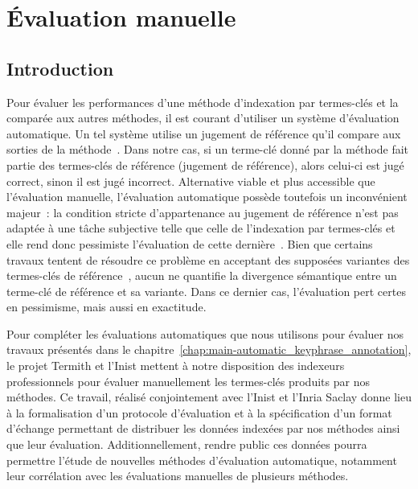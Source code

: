 \chapter{Évaluation manuelle}
\label{chap:main-manuelle_evaluation_of_keyphrase_annotation}

  \section{Introduction}
  \label{sec:main-automatic_evaluation_of_keyphrase_annotation-introduction}
    Pour évaluer les performances d'une méthode d'indexation par termes-clés et
    la comparée aux autres méthodes, il est courant d'utiliser un système
    d'évaluation automatique. Un tel système utilise un jugement de référence
    qu'il compare aux sorties de la méthode~\cite{voorhees2002philosophy}. Dans
    notre cas, si un terme-clé donné par la méthode fait partie des termes-clés
    de référence (jugement de référence), alors celui-ci est jugé correct, sinon
    il est jugé incorrect. Alternative viable et plus accessible que
    l'évaluation manuelle, l'évaluation automatique possède toutefois un
    inconvénient majeur~: la condition stricte d'appartenance au jugement de
    référence n'est pas adaptée à une tâche subjective telle que celle de
    l'indexation par termes-clés et elle rend donc pessimiste l'évaluation de
    cette dernière~\cite{hasan2014state_of_the_art}. Bien que certains travaux
    tentent de résoudre ce problème en acceptant des supposées variantes des
    termes-clés de référence~\cite{zesch2009rprecision,kim2010rprecision}, aucun
    ne quantifie la divergence sémantique entre un terme-clé de référence et sa
    variante. Dans ce dernier cas, l'évaluation pert certes en pessimisme, mais
    aussi en exactitude.
    
    Pour compléter les évaluations automatiques que nous utilisons pour évaluer
    nos travaux présentés dans le
    chapitre~\ref{chap:main-automatic_keyphrase_annotation}, le projet Termith
    et l'Inist mettent à notre disposition des indexeurs professionnels pour
    évaluer manuellement les termes-clés produits par nos méthodes. Ce travail,
    réalisé conjointement avec l'Inist et l'Inria Saclay donne lieu à la
    formalisation d'un protocole d'évaluation et à la spécification d'un format
    d'échange permettant de distribuer les données indexées par nos méthodes
    ainsi que leur évaluation. Additionnellement, rendre public ces données
    pourra permettre l'étude de nouvelles méthodes d'évaluation automatique,
    notamment leur corrélation avec les évaluations manuelles de plusieurs
    méthodes.

